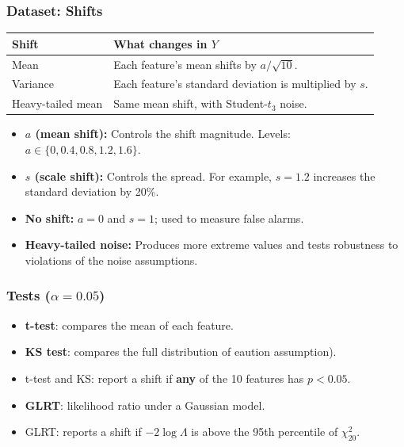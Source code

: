 \documentclass{beamer}
\begin{document}
\begin{frame}[t]
\frametitle{Dataset: Shifts}
\small

\centering
\begin{tabular}{@{}l p{}@{}}
\textbf{Shift} & \textbf{What changes in $Y$} \\
\hline
Mean & Each feature's mean shifts by $a/\sqrt{10}$. \\
Variance & Each feature's standard deviation is multiplied by $s$. \\
Heavy-tailed mean & Same mean shift, with Student-$t_3$ noise. \\
\end{tabular}

\vspace{0.3cm}

\begin{itemize}
    \setlength{\itemsep}{0.15cm}
    \setlength{\parskip}{0pt}

    \item \textbf{$a$ (mean shift):} Controls the shift magnitude.
    Levels: $a \in \{0, 0.4, 0.8, 1.2, 1.6\}$.

    \item \textbf{$s$ (scale shift):} Controls the spread.
    For example, $s=1.2$ increases the standard deviation by 20\%.

    \item \textbf{No shift:} $a=0$ and $s=1$; used to measure false alarms.

    \item \textbf{Heavy-tailed noise:} Produces more extreme values and tests robustness to violations of the noise assumptions.
\end{itemize}

\end{frame}

\begin{frame}[t]
\frametitle{Tests ($\alpha = 0.05$)}
\begin{itemize}
    \item \textbf{t-test}: compares the mean of each feature.
    \item \textbf{KS test}: compares the full distribution of eaution assumption).
    \item t-test and KS: report a shift if \textbf{any} of the 10 features has $p < 0.05$.
    \item \textbf{GLRT}: likelihood ratio under a Gaussian model.
    \item GLRT: reports a shift if $-2\log\Lambda$ is above the 95th percentile of $\chi^2_{20}$.
\end{itemize}
\end{frame}
\end{document}
